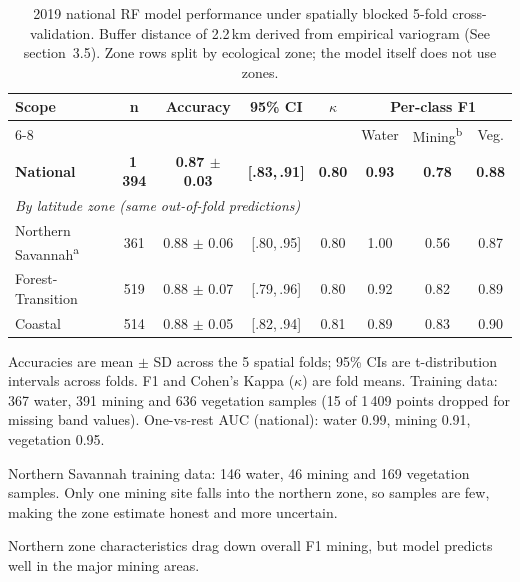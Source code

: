 \documentclass[]{interact}
\begin{document}
\begin{table}[htbp]
\centering
\caption{2019 national RF model performance under spatially blocked 5-fold cross-validation. Buffer distance of 2.2\,km derived from empirical variogram (See section~3.5). Zone rows split by ecological zone; the model itself does not use zones.}
\label{tab:model_performance}
\small
\begin{threeparttable}
\begin{tabular}{lccccccc}
\toprule
\multirow{2}{*}{\textbf{Scope}} & \multirow{2}{*}{\textbf{n}} & \multirow{2}{*}{\textbf{Accuracy}} & \multirow{2}{*}{\textbf{95\% CI}} & \multirow{2}{*}{\textbf{$\kappa$}} & \multicolumn{3}{c}{\textbf{Per-class F1}} \\
\cmidrule(lr){6-8}
 & & & & & Water & Mining\textsuperscript{b} & Veg. \\
\midrule
\textbf{National}                    & \textbf{1\,394} & \textbf{0.87 $\pm$ 0.03} & \textbf{[.83,\,.91]} & \textbf{0.80} & \textbf{0.93} & \textbf{0.78} & \textbf{0.88} \\
\midrule
\multicolumn{8}{l}{\textit{By latitude zone (same out-of-fold predictions)}} \\
Northern Savannah\textsuperscript{a} & 361   & 0.88 $\pm$ 0.06 & [.80,\,.95] & 0.80 & 1.00 & 0.56 & 0.87 \\
Forest-Transition                    & 519   & 0.88 $\pm$ 0.07 & [.79,\,.96] & 0.80 & 0.92 & 0.82 & 0.89 \\
Coastal                              & 514   & 0.88 $\pm$ 0.05 & [.82,\,.94] & 0.81 & 0.89 & 0.83 & 0.90 \\
\bottomrule
\end{tabular}
\begin{tablenotes}[flushleft]
\footnotesize
\item Accuracies are mean $\pm$ SD across the 5 spatial folds; 95\% CIs are t-distribution intervals across folds. F1 and Cohen's Kappa ($\kappa$) are fold means. Training data: 367 water, 391 mining and 636 vegetation samples (15 of 1\,409 points dropped for missing band values). One-vs-rest AUC (national): water 0.99, mining 0.91, vegetation 0.95.
\item[\textsuperscript{a}] Northern Savannah training data: 146 water, 46 mining and 169 vegetation samples. Only one mining site falls into the northern zone, so samples are few, making the zone estimate honest and more uncertain.
\item[\textsuperscript{b}] Northern zone characteristics drag down overall F1 mining, but model predicts well in the major mining areas.
\end{tablenotes}
\end{threeparttable}
\end{table}
\end{document}
